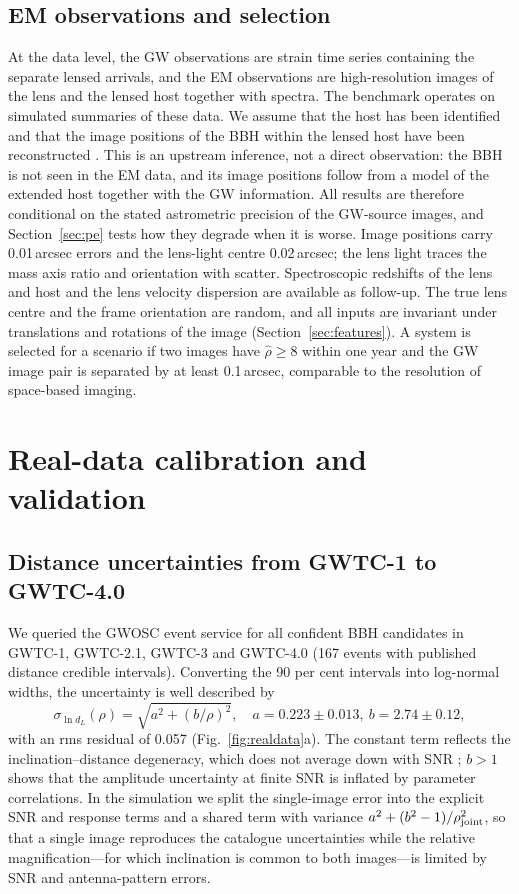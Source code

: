 \subsection{EM observations and selection}
At the data level, the GW observations are strain time series containing the separate lensed arrivals, and the EM observations are high-resolution images of the lens and the lensed host together with spectra. The benchmark operates on simulated summaries of these data. We assume that the host has been identified and that the image positions of the BBH within the lensed host have been reconstructed \citep{hannuksela2020localizing,wempe2022lensing,uronen2026galacticcentres}. This is an upstream inference, not a direct observation: the BBH is not seen in the EM data, and its image positions follow from a model of the extended host together with the GW information. All results are therefore conditional on the stated astrometric precision of the GW-source images, and Section~\ref{sec:pe} tests how they degrade when it is worse. Image positions carry 0.01\,arcsec errors and the lens-light centre 0.02\,arcsec; the lens light traces the mass axis ratio and orientation with scatter. Spectroscopic redshifts of the lens and host and the lens velocity dispersion are available as follow-up. The true lens centre and the frame orientation are random, and all inputs are invariant under translations and rotations of the image (Section~\ref{sec:features}). A system is selected for a scenario if two images have $\hat\rho\ge8$ within one year and the GW image pair is separated by at least 0.1\,arcsec, comparable to the resolution of space-based imaging.

\section{Real-data calibration and validation}
\label{sec:realdata}
\subsection{Distance uncertainties from GWTC-1 to GWTC-4.0}
We queried the GWOSC event service \citep{gwosc2023} for all confident BBH candidates in GWTC-1, GWTC-2.1, GWTC-3 and GWTC-4.0 (167 events with published distance credible intervals). Converting the 90 per cent intervals into log-normal widths, the uncertainty is well described by
\begin{equation}
\sigma_{\ln d_L}(\rho)=\sqrt{a^2+(b/\rho)^2},\quad a=0.223\pm0.013,\ b=2.74\pm0.12,
\end{equation}
with an rms residual of 0.057 (Fig.~\ref{fig:realdata}a). The constant term reflects the inclination--distance degeneracy, which does not average down with SNR \citep{cutler1994gravitational}; $b>1$ shows that the amplitude uncertainty at finite SNR is inflated by parameter correlations. In the simulation we split the single-image error into the explicit SNR and response terms and a shared term with variance $a^2+(b^2-1)/\rho_{\rm joint}^2$, so that a single image reproduces the catalogue uncertainties while the relative magnification---for which inclination is common to both images---is limited by SNR and antenna-pattern errors.

